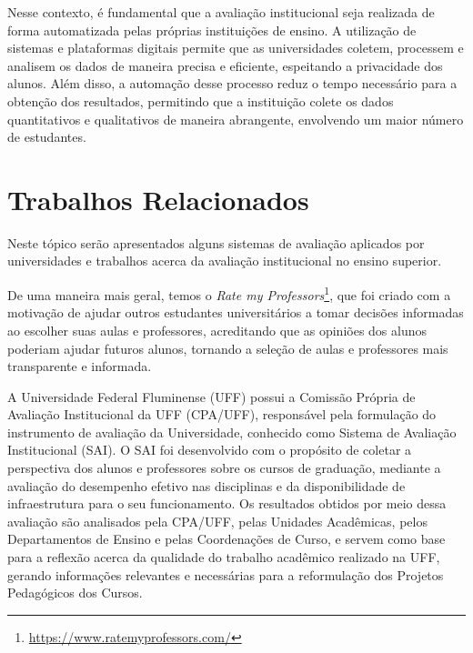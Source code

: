 Nesse contexto, é fundamental que a avaliação institucional seja realizada de forma automatizada pelas próprias instituições de ensino. A utilização de sistemas e plataformas digitais permite que as universidades coletem, processem e analisem os dados de maneira precisa e eficiente, espeitando a privacidade dos alunos. Além disso, a automação desse processo reduz o tempo necessário para a obtenção dos resultados, permitindo que a instituição colete os dados quantitativos e qualitativos de maneira abrangente, envolvendo um maior número de estudantes.



\section{Trabalhos Relacionados}
Neste tópico serão apresentados alguns sistemas de avaliação aplicados por universidades e trabalhos acerca da avaliação institucional no ensino superior.

De uma maneira mais geral, temos o \textit{Rate my Professors}\footnote{\url{https://www.ratemyprofessors.com/}}, que foi criado
com a motivação de ajudar outros estudantes universitários a tomar decisões informadas ao escolher suas aulas e professores, acreditando que as opiniões dos alunos poderiam ajudar futuros alunos, tornando a seleção de aulas e professores mais transparente e informada.

A Universidade Federal Fluminense (UFF) possui a Comissão Própria de Avaliação Institucional da UFF (CPA/UFF),
responsável pela formulação do instrumento de avaliação da Universidade, conhecido como Sistema de Avaliação Institucional (SAI).
O SAI foi desenvolvido com o propósito de coletar a perspectiva dos alunos e professores sobre os cursos de graduação,
mediante a avaliação do desempenho efetivo nas disciplinas e da disponibilidade de infraestrutura para o seu funcionamento.
Os resultados obtidos por meio dessa avaliação são analisados pela CPA/UFF, pelas Unidades Acadêmicas, pelos Departamentos de Ensino e pelas Coordenações de Curso,
e servem como base para a reflexão acerca da qualidade do trabalho acadêmico realizado na UFF, gerando informações relevantes e necessárias para a reformulação dos Projetos Pedagógicos dos Cursos.





